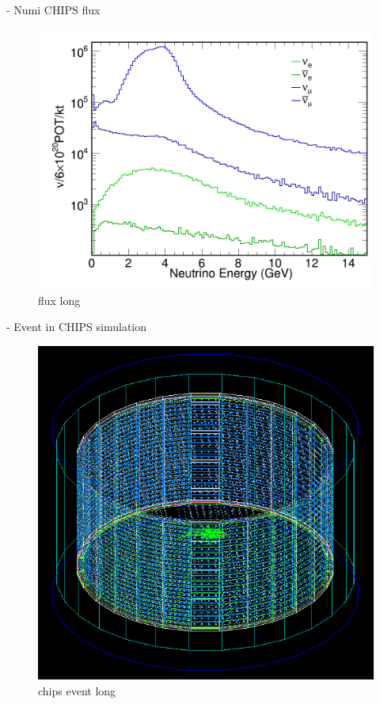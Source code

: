 - Numi CHIPS flux
\begin{figure}
    \includegraphics[width=\textwidth]{diagrams/4-chips/flux.png}
    \caption[flux short]{flux long}
    \label{fig:flux}
\end{figure}
- Event in CHIPS simulation
\begin{figure}
    \includegraphics[width=\textwidth]{diagrams/4-chips/chips_event.png}
    \caption[chips event short]{chips event long}
    \label{fig:chips_event}
\end{figure}
